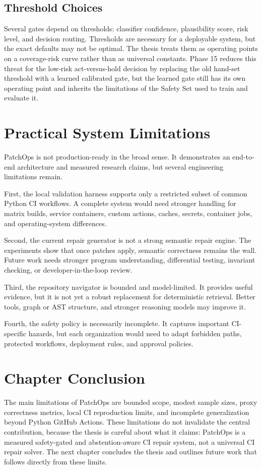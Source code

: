 \subsection{Threshold Choices}

Several gates depend on thresholds: classifier confidence, plausibility score, risk level, and decision routing.
Thresholds are necessary for a deployable system, but the exact defaults may not be optimal. The thesis treats
them as operating points on a coverage-risk curve rather than as universal constants. Phase 15 reduces this
threat for the low-risk act-versus-hold decision by replacing the old hand-set threshold with a learned
calibrated gate, but the learned gate still has its own operating point and inherits the limitations of the
Safety Set used to train and evaluate it.

\section{Practical System Limitations}

PatchOps is not production-ready in the broad sense. It demonstrates an end-to-end architecture and measured
research claims, but several engineering limitations remain.

First, the local validation harness supports only a restricted subset of common Python CI workflows. A complete
system would need stronger handling for matrix builds, service containers, custom actions, caches, secrets,
container jobs, and operating-system differences.

Second, the current repair generator is not a strong semantic repair engine. The experiments show that once
patches apply, semantic correctness remains the wall. Future work needs stronger program understanding,
differential testing, invariant checking, or developer-in-the-loop review.

Third, the repository navigator is bounded and model-limited. It provides useful evidence, but it is not yet a
robust replacement for deterministic retrieval. Better tools, graph or AST structure, and stronger reasoning
models may improve it.

Fourth, the safety policy is necessarily incomplete. It captures important CI-specific hazards, but each
organization would need to adapt forbidden paths, protected workflows, deployment rules, and approval policies.

\section{Chapter Conclusion}

The main limitations of PatchOps are bounded scope, modest sample sizes, proxy correctness metrics, local CI
reproduction limits, and incomplete generalization beyond Python GitHub Actions. These limitations do not
invalidate the central contribution, because the thesis is careful about what it claims: PatchOps is a measured
safety-gated and abstention-aware CI repair system, not a universal CI repair solver. The next chapter concludes
the thesis and outlines future work that follows directly from these limits.
